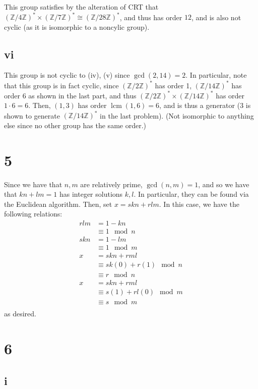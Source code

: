 \documentclass[12pt,letterpaper]{article}
\theoremstyle{definition}
\newcommand{\Z}{\mathbb{Z}}
\DeclareMathOperator{\lcm}{lcm}
\begin{document}
This group satisfies by the alteration of CRT that $(\Z/4\Z)^{*} \times (\Z/7\Z)^{*} \cong (\Z/28\Z)^{*}$, and thus has order $12$, and is also not cyclic (as it is isomorphic to a noncylic group).

\subsection*{vi}

This group is not cyclic to (iv), (v) since $\gcd(2,14) = 2$. In particular, note that this group is in fact cyclic, since $(\Z/2\Z)^{*}$ has order 1, $(\Z/14\Z)^{*}$ has order $6$ as shown in the last part, and thus $(\Z/2\Z)^{*} \times (\Z/14\Z)^{*}$ has order $1 \cdot 6 = 6$. Then, $(1,3)$ has order $\lcm(1,6) = 6$, and is thus a generator ($3$ is shown to generate $(\Z/14\Z)^{*}$ in the last problem). (Not isomorphic to anything else since no other group has the same order.)

\section*{5}

Since we have that $n,m$ are relatively prime, $\gcd(n,m) = 1$, and so we have that $kn + lm = 1$ has integer solutions $k,l$. In particular, they can be found via the Euclidean algorithm. Then, set $x = skn + rlm$. In this case, we have the following relations:
\begin{align*}
  rlm &= 1 - kn \\
      &\equiv 1 \mod n \\
  skn &= 1 - lm \\
      &\equiv 1 \mod m \\
  x &= skn + rml \\
       &\equiv sk(0) + r(1) \mod n \\
       &\equiv r \mod n \\
  x &= skn + rml \\
       &\equiv s(1) + rl(0) \mod m \\
       &\equiv s \mod m \\
\end{align*}
as desired.

\section*{6}

\subsection*{i}
\end{document}
